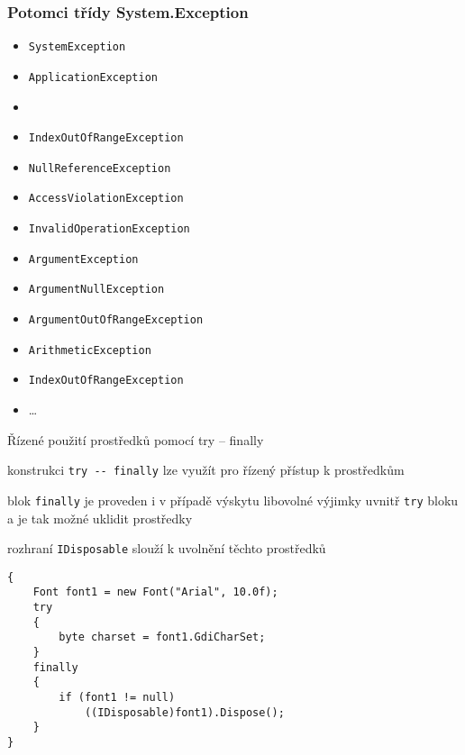 \begin{frame}[fragile]
\frametitle{Potomci třídy System.Exception}
\begin{noteblock}{}
\begin{itemize}
\item \lstinline|SystemException|
\item \lstinline|ApplicationException|
\item[]
\item \lstinline|IndexOutOfRangeException|
\item \lstinline|NullReferenceException|
\item \lstinline|AccessViolationException|
\item \lstinline|InvalidOperationException|
\item \lstinline|ArgumentException|
\item \lstinline|ArgumentNullException|
\item \lstinline|ArgumentOutOfRangeException|
\item \lstinline|ArithmeticException|
\item \lstinline|IndexOutOfRangeException|
\item \ldots
\end{itemize}
\end{noteblock}

\end{frame}




\begin{frame}[fragile]
\begin{bitemize}{Řízené použití prostředků pomocí try -- finally}
\item konstrukci \lstinline|try -- finally| lze využít pro řízený přístup k prostředkům
\item blok \lstinline|finally| je proveden i v případě výskytu libovolné výjimky uvnitř \lstinline|try| bloku a je tak možné uklidit prostředky
\item rozhraní \lstinline|IDisposable| slouží k uvolnění těchto prostředků
\end{bitemize}
\vfill
\begin{yesblock}
\begin{lstlisting}
{
	Font font1 = new Font("Arial", 10.0f);
	try
	{
		byte charset = font1.GdiCharSet;
	}
	finally
	{
		if (font1 != null)
			((IDisposable)font1).Dispose();
	}
}
\end{lstlisting}
\end{yesblock}
\end{frame}


